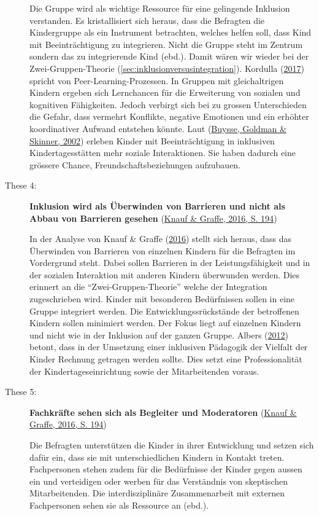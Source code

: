 \documentclass[
  ngerman,
  11pt,
  paper=a4,
  twoside,
  titlepage=true,
  openright,
  abstract=on,
  toc=listofnumbered,
  numbers=noenddot,
  chapterprefix=true,
  headings=optiontohead,
  svgnames,
  dvipsnames]{scrreprt}
\begin{document}
\begin{description}
Die Gruppe wird als wichtige Ressource für eine gelingende Inklusion
verstanden. Es kristallisiert sich heraus, dass die Befragten die
Kindergruppe als ein Instrument betrachten, welches helfen soll, dass
Kind mit Beeinträchtigung zu integrieren. Nicht die Gruppe steht im
Zentrum sondern das zu integrierende Kind (ebd.). Damit wären wir wieder
bei der Zwei-Gruppen-Theorie (\cref{sec:inklusionversusintegration}).
Kordulla (\protect\hyperlink{ref-peer-learning}{2017}) spricht von
Peer-Learning-Prozessen. In Gruppen mit gleichaltrigen Kindern ergeben
sich Lernchancen für die Erweiterung von sozialen und kognitiven
Fähigkeiten. Jedoch verbirgt sich bei zu grossen Unterschieden die
Gefahr, dass vermehrt Konflikte, negative Emotionen und ein erhöhter
koordinativer Aufwand entstehen könnte. Laut
(\protect\hyperlink{ref-buysse}{Buysse, Goldman \& Skinner, 2002})
erleben Kinder mit Beeinträchtigung in inklusiven Kindertagesstätten
mehr soziale Interaktionen. Sie haben dadurch eine grössere Chance,
Freundschaftsbeziehungen aufzubauen.
\item[These 4:]
\textbf{Inklusion wird als Überwinden von Barrieren und nicht als Abbau
von Barrieren gesehen}
(\protect\hyperlink{ref-alltagsTheorienUeberInklusion}{Knauf \& Graffe,
2016, S. 194})

In der Analyse von Knauf \& Graffe
(\protect\hyperlink{ref-alltagsTheorienUeberInklusion}{2016}) stellt
sich heraus, dass das Überwinden von Barrieren von einzelnen Kindern für
die Befragten im Vordergrund steht. Dabei sollen Barrieren in der
Leistungsfähigkeit und in der sozialen Interaktion mit anderen Kindern
überwunden werden. Dies erinnert an die “Zwei-Gruppen-Theorie” welche
der Integration zugeschrieben wird. Kinder mit besonderen Bedürfnissen
sollen in eine Gruppe integriert werden. Die Entwicklungssrückstände der
betroffenen Kindern sollen minimiert werden. Der Fokus liegt auf
einzelnen Kindern und nicht wie in der Inklusion auf der ganzen Gruppe.
Albers (\protect\hyperlink{ref-albers_vielfalt_2012}{2012}) betont, dass
in der Umsetzung einer inklusiven Pädagogik der Vielfalt der Kinder
Rechnung getragen werden sollte. Dies setzt eine Professionalität der
Kindertageseinrichtung sowie der Mitarbeitenden voraus.
\item[These 5:]
\textbf{Fachkräfte sehen sich als Begleiter und Moderatoren}
(\protect\hyperlink{ref-alltagsTheorienUeberInklusion}{Knauf \& Graffe,
2016, S. 194})

Die Befragten unterstützen die Kinder in ihrer Entwicklung und setzen
sich dafür ein, dass sie mit unterschiedlichen Kindern in Kontakt
treten. Fachpersonen stehen zudem für die Bedürfnisse der Kinder gegen
aussen ein und verteidigen oder werben für das Verständnis von
skeptischen Mitarbeitenden. Die interdisziplinäre Zusammenarbeit mit
externen Fachpersonen sehen sie als Ressource an (ebd.).
\end{description}
\end{document}
